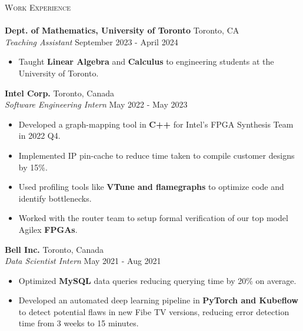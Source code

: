 \documentclass[a4paper]{article}
\newcommand{\lineunder} {
    \vspace*{-8pt} \\
    \hspace*{-18pt} \hrulefill \\
}
\newcommand{\header} [1] {
    {\hspace*{-18pt}\vspace*{6pt} \textsc{#1}}
    \vspace*{-6pt} \lineunder
}
\begin{document}
\header{Work Experience}

\textbf{Dept. of Mathematics, University of Toronto} \hfill Toronto, CA\\
\textit{Teaching Assistant} \hfill September 2023 - April 2024\\
\vspace{-2.5mm}
\begin{itemize} \itemsep 0.5pt
	\item Taught \textbf{Linear Algebra} and \textbf{Calculus} to engineering students at the University of Toronto.
    \vspace{-2mm}
\end{itemize}

\vspace{1mm}

\textbf{Intel Corp.} \hfill Toronto, Canada\\
\textit{Software Engineering Intern} \hfill May 2022 - May 2023\\
\vspace{-2.5mm}
\begin{itemize} \itemsep 1pt
	\item Developed a graph-mapping tool in \textbf{C++} for Intel's FPGA Synthesis Team in 2022 Q4.
	\vspace{-1.5mm}
	\item Implemented IP pin-cache to reduce time taken to compile customer designs by 15\%.
	\vspace{-1.5mm}
	\item Used profiling tools like \textbf{VTune and flamegraphs} to optimize code and identify bottlenecks. 
	\vspace{-1.5mm}
    \item Worked with the router team to setup formal verification of our top model Agilex \textbf{FPGAs}. 
    \vspace{-1.5mm}
\end{itemize}

\textbf{Bell Inc.} \hfill Toronto, Canada\\
\textit{Data Scientist Intern} \hfill May 2021 - Aug 2021\\
\vspace{-2.5mm}
\begin{itemize} \itemsep 1pt
	\item Optimized \textbf{MySQL} data queries reducing querying time by 20\% on average.
	\vspace{-1.5mm}
	\item Developed an automated deep learning pipeline in \textbf{PyTorch and Kubeflow} to detect potential flaws in new Fibe TV versions, reducing error detection time from 3 weeks to 15 minutes.
    \vspace{-1.5mm}
\end{itemize}
\end{document}
